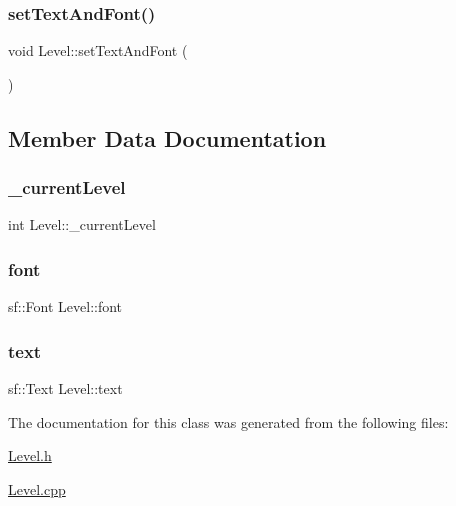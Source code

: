 \mbox{\label{class_level_aa726d09473bbb551477994c70e516a99}} 
\subsubsection{\texorpdfstring{set\+Text\+And\+Font()}{setTextAndFont()}}
{\footnotesize\ttfamily void Level\+::set\+Text\+And\+Font (\begin{DoxyParamCaption}{ }\end{DoxyParamCaption})\hspace{0.3cm}{\ttfamily [private]}}



\subsection{Member Data Documentation}
\mbox{\label{class_level_a70f3892ab0296e9ab92798b62d1dc894}} 
\subsubsection{\texorpdfstring{\+\_\+current\+Level}{\_currentLevel}}
{\footnotesize\ttfamily int Level\+::\+\_\+current\+Level\hspace{0.3cm}{\ttfamily [private]}}

\mbox{\label{class_level_af8ac9bfc42fb1b12b12538e2b9c170e7}} 
\subsubsection{\texorpdfstring{font}{font}}
{\footnotesize\ttfamily sf\+::\+Font Level\+::font\hspace{0.3cm}{\ttfamily [private]}}

\mbox{\label{class_level_a4f0d652d48634a83436f314c0581ac23}} 
\subsubsection{\texorpdfstring{text}{text}}
{\footnotesize\ttfamily sf\+::\+Text Level\+::text\hspace{0.3cm}{\ttfamily [private]}}



The documentation for this class was generated from the following files\+:\begin{DoxyCompactItemize}
\item 
\hyperlink{_level_8h}{Level.\+h}\item 
\hyperlink{_level_8cpp}{Level.\+cpp}\end{DoxyCompactItemize}
